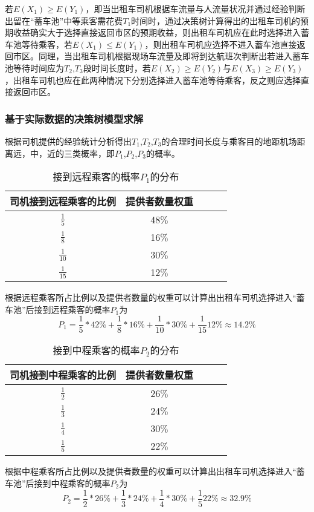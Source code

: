 \documentclass[withoutpreface,bwprint]{cumcmthesis} %
\begin{document}
\newpage
若$E(X_1)≥E(Y_1)$，即当出租车司机根据车流量与人流量状况并通过经验判断出留在“蓄车池”中等乘客需花费$T_1$时间时，通过决策树计算得出的出租车司机的预期收益确实大于选择直接返回市区的预期收益，则出租车司机应在此时选择进入蓄车池等待乘客，若$E(X_1)≤E(Y_1)$，则出租车司机应选择不进入蓄车池直接返回市区。同理，当出租车司机根据现场车流量及即将到达航班次判断出若进入蓄车池等待时间应为$T_2$,$T_3$段时间长度时，若$E(X_2)≥E(Y_2)$与$E(X_3)≥E(Y_3)$，出租车司机也应在此两种情况下分别选择进入蓄车池等待乘客，反之则应选择直接返回市区。
\subsubsection{基于实际数据的决策树模型求解}
根据司机提供的经验统计分析得出$T_1$,$T_2$,$T_3$的合理时间长度与乘客目的地距机场距离远，中，近的三类概率，即$P_1$,$P_2$,$P_3$的概率。
\begin{table}[!htbp]
	\caption{接到远程乘客的概率$P_1$的分布}\label{tab:001} \centering
	\begin{tabular}{ccccc}
		\toprule[1.5pt]
	    司机接到远程乘客的比例& 提供者数量权重\\
		\midrule[1pt]
		$\frac{1}{5}$ & 48$\%$\\
		$\frac{1}{8}$ & 16$\%$\\
		$\frac{1}{10}$ & 30$\%$\\
		$\frac{1}{15}$ & 12$\%$\\
		\bottomrule[1.5pt]
	\end{tabular}
\end{table}

根据远程乘客所占比例以及提供者数量的权重可以计算出出租车司机选择进入“蓄车池”后接到远程乘客的概率$P_1$为
$$
P_{1}=\frac{1}{5} * 42 \%+\frac{1}{8} * 16 \%+\frac{1}{10} * 30 \%+\frac{1}{15} 12 \% \approx 14.2 \%
$$

\begin{table}[!htbp]
	\caption{接到中程乘客的概率$P_2$的分布}\label{tab:001} \centering
	\begin{tabular}{ccccc}
		\toprule[1.5pt]
		司机接到中程乘客的比例& 提供者数量权重\\
		\midrule[1pt]
		$\frac{1}{2}$ & 26$\%$\\
		$\frac{1}{3}$ & 24$\%$\\
		$\frac{1}{4}$ & 30$\%$\\
		$\frac{1}{5}$ & 22$\%$\\
		\bottomrule[1.5pt]
	\end{tabular}
\end{table}
\newpage
根据中程乘客所占比例以及提供者数量的权重可以计算出出租车司机选择进入“蓄车池”后接到中程乘客的概率$P_2$为
$$
P_{2}=\frac{1}{2} * 26 \%+\frac{1}{3} * 24 \%+\frac{1}{4} * 30 \%+\frac{1}{5} 22 \% \approx 32.9 \%
$$
\end{document}
